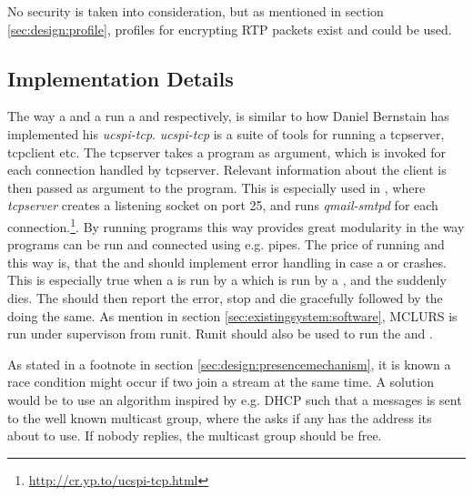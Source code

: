 \noindent{}No security is taken into consideration, but as mentioned in section \ref{sec:design:profile}, profiles for encrypting RTP packets exist and could be used.

\subsection{Implementation Details}

The way a \pub{} and a \sub{} run a \pro{} and \con{} respectively, is similar to how Daniel Bernstain has implemented his \textit{ucspi-tcp}. \textit{ucspi-tcp} is a suite of tools for running a tcpserver, tcpclient etc. The tcpserver takes a program as argument, which is invoked for each connection handled by tcpserver. Relevant information about the client is then passed as argument to the program. This is especially used in  , where \textit{tcpserver} creates a listening socket on port 25, and runs \textit{qmail-smtpd} for each connection.\footnote{\url{http://cr.yp.to/ucspi-tcp.html}}. By running programs this way provides great modularity in the way programs can be run and connected using e.g. pipes. The price of running \pros{} and \cons{} this way is, that the \sub{} and \pub{} should implement error handling in case a \con{} or \pro{} crashes. This is especially true when a  is run by a \pub{} which is run by a \sub{}, and the  suddenly dies. The \pub{} should then report the error, stop and die gracefully followed by the \sub{} doing the same. As mention in section \ref{sec:existingsystem:software}, MCLURS is run under supervison from runit. Runit should also be used to run the \sub{} and \pub{}. 


\noindent{}As stated in a footnote in section \ref{sec:design:presencemechanism}, it is known a race condition might occur if two \pubs{} join a stream at the same time. A solution would be to use an algorithm inspired by e.g. \ac{DHCP} such that a messages is sent to the well known multicast group, where the \pub{} asks if any has the address its about to use. If nobody replies, the multicast group should be free.


